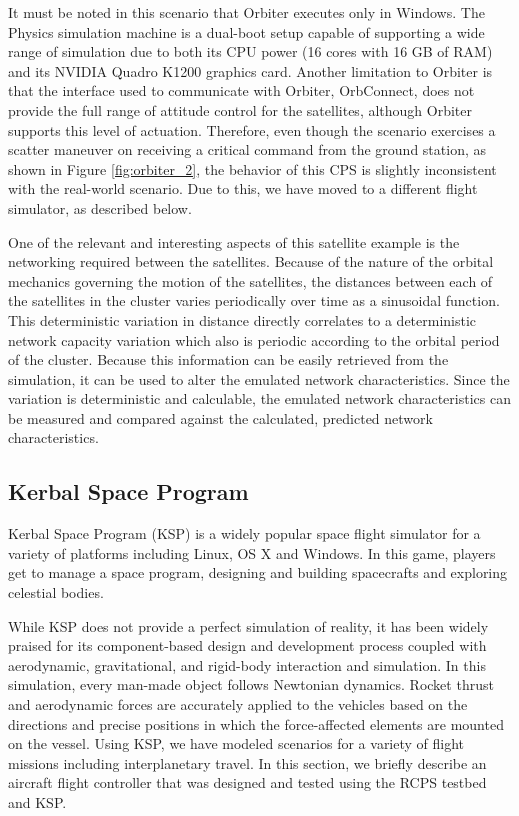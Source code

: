 It must be noted in this scenario that Orbiter executes only in Windows. The Physics simulation machine is a dual-boot setup capable of supporting a wide range of simulation due to both its CPU power (16 cores with 16 GB of RAM) and its NVIDIA Quadro K1200 graphics card. Another limitation to Orbiter is that the interface used to communicate with Orbiter, OrbConnect, does not provide the full range of attitude control for the satellites, although Orbiter supports this level of actuation. Therefore, even though the scenario exercises a scatter maneuver on receiving a critical command from the ground station, as shown in Figure \ref{fig:orbiter_2}, the behavior of this CPS is slightly inconsistent with the real-world scenario. Due to this, we have moved to a different flight simulator, as described below.  

One of the relevant and interesting aspects of this satellite example is the networking required between the satellites.  Because of the nature of the orbital mechanics governing the motion of the satellites, the distances between each of the satellites in the cluster varies periodically over time as a sinusoidal function.  This deterministic variation in distance directly correlates to a deterministic network capacity variation which also is periodic according to the orbital period of the cluster.  Because this information can be easily retrieved from the simulation, it can be used to alter the emulated network characteristics.  Since the variation is deterministic and calculable, the emulated network characteristics can be measured and compared against the calculated, predicted network characteristics. 

\subsection{Kerbal Space Program}

Kerbal Space Program \cite{KSP} (KSP) is a widely popular space flight simulator for a variety of platforms including Linux, OS X and Windows. In this game, players get to manage a space program, designing and building spacecrafts and exploring celestial bodies. 

While KSP does not provide a perfect simulation of reality, it has been widely praised for its component-based design and development process coupled with aerodynamic, gravitational, and rigid-body interaction and simulation. In this simulation, every man-made object follows Newtonian dynamics. Rocket thrust and aerodynamic forces are accurately applied to the vehicles based on the directions and precise positions in which the force-affected elements are mounted on the vessel. Using KSP, we have modeled scenarios for a variety of flight missions including interplanetary travel. In this section, we briefly describe an aircraft flight controller that was designed and tested using the RCPS testbed and KSP.

